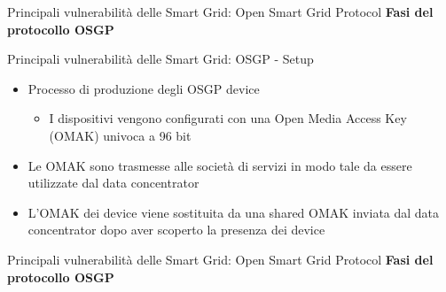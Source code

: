 \begin{frame}{Principali vulnerabilità delle Smart Grid: Open Smart Grid Protocol}
	\textbf{Fasi del protocollo OSGP}
\end{frame}

\begin{frame}{Principali vulnerabilità delle Smart Grid: OSGP - Setup}
	\begin{itemize}[<+- | alert@+>]
		\item Processo di produzione degli OSGP device
		\begin{itemize}
			\item I dispositivi vengono configurati con una Open Media Access Key (OMAK) univoca a 96 bit
		\end{itemize}
		\item Le OMAK sono trasmesse alle società di servizi in modo tale da essere utilizzate dal data concentrator
		\item L'OMAK dei device viene sostituita da una shared OMAK inviata dal data concentrator dopo aver scoperto la presenza dei device
	\end{itemize}
\end{frame}

\begin{frame}{Principali vulnerabilità delle Smart Grid: Open Smart Grid Protocol}
	\textbf{Fasi del protocollo OSGP}
\end{frame}

